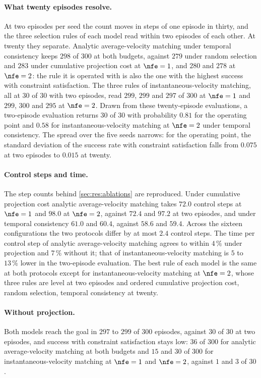 \paragraph{What twenty episodes resolve.}
At two episodes per seed the count moves in steps of one episode in thirty, and the three selection rules
of each model read within two episodes of each other. At twenty they separate.
Analytic average-velocity matching under temporal consistency keeps $298$ of $300$ at both budgets, against
$279$ under random selection and $283$ under cumulative projection cost at $\nfe=1$, and $280$ and $278$ at
$\nfe=2$: the rule it is operated with is also the one with the highest success with constraint
satisfaction. The three rules of instantaneous-velocity matching, all at $30$ of $30$ with two episodes,
read $299$, $299$ and $297$ of $300$ at $\nfe=1$ and $299$, $300$ and $295$ at $\nfe=2$. Drawn from
these twenty-episode evaluations, a two-episode evaluation returns $30$ of $30$ with probability $0.81$ for
the operating point and $0.58$ for instantaneous-velocity matching at $\nfe=2$ under temporal consistency. The spread over the five
seeds narrows: for the operating point, the standard deviation of the success rate with
constraint satisfaction falls from $0.075$ at two episodes to $0.015$ at twenty.

\paragraph{Control steps and time.}
The step counts behind \autoref{sec:res:ablations} are reproduced. Under cumulative projection cost
analytic average-velocity matching takes $72.0$ control steps at $\nfe=1$ and $98.0$ at $\nfe=2$, against
$72.4$ and $97.2$ at two episodes, and under temporal consistency $61.0$ and $60.4$, against $58.6$ and
$59.4$. Across the sixteen configurations the two protocols differ by at most $2.4$ control steps. The
time per control step of analytic average-velocity matching agrees to within $4\,\%$ under projection and
$7\,\%$ without it; that of instantaneous-velocity matching is $5$ to $13\,\%$ lower in the two-episode
evaluation. The best rule of each model is the same at both protocols except for instantaneous-velocity
matching at $\nfe=2$, whose three rules are level at two episodes and ordered cumulative projection cost,
random selection, temporal consistency at twenty.

\paragraph{Without projection.}
Both models reach the goal in $297$ to $299$ of $300$ episodes, against $30$ of $30$ at two episodes, and
success with constraint satisfaction stays low: $36$ of $300$ for analytic average-velocity matching at
both budgets and $15$ and $30$ of $300$ for instantaneous-velocity matching at $\nfe=1$ and $\nfe=2$,
against $1$ and $3$ of $30$.


